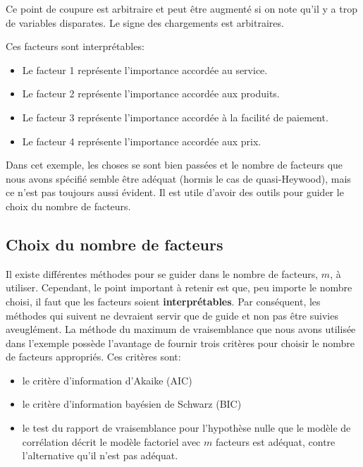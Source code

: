 \documentclass[
  11pt,
  letterpaper,
]{scrbook}
\providecommand{\tightlist}{%
  \setlength{\itemsep}{0pt}\setlength{\parskip}{0pt}}\usepackage{longtable,booktabs,array}
\theoremstyle{definition}
\theoremstyle{remark}
\begin{document}
Ce point de coupure est arbitraire et peut être augmenté si on note
qu'il y a trop de variables disparates. Le signe des chargements est
arbitraires.

Ces facteurs sont interprétables:

\begin{itemize}
\tightlist
\item
  Le facteur 1 représente l'importance accordée au service.
\item
  Le facteur 2 représente l'importance accordée aux produits.
\item
  Le facteur 3 représente l'importance accordée à la facilité de
  paiement.
\item
  Le facteur 4 représente l'importance accordée aux prix.
\end{itemize}

Dans cet exemple, les choses se sont bien passées et le nombre de
facteurs que nous avons spécifié semble être adéquat (hormis le cas de
quasi-Heywood), mais ce n'est pas toujours aussi évident. Il est utile
d'avoir des outils pour guider le choix du nombre de facteurs.

\subsection{Choix du nombre de
facteurs}\label{choix-du-nombre-de-facteurs}

Il existe différentes méthodes pour se guider dans le nombre de
facteurs, \(m\), à utiliser. Cependant, le point important à retenir est
que, peu importe le nombre choisi, il faut que les facteurs soient
\textbf{interprétables}. Par conséquent, les méthodes qui suivent ne
devraient servir que de guide et non pas être suivies aveuglément. La
méthode du maximum de vraisemblance que nous avons utilisée dans
l'exemple possède l'avantage de fournir trois critères pour choisir le
nombre de facteurs appropriés. Ces critères sont:

\begin{itemize}
\tightlist
\item
  le critère d'information d'Akaike (AIC)
\item
  le critère d'information bayésien de Schwarz (BIC)
\item
  le test du rapport de vraisemblance pour l'hypothèse nulle que le
  modèle de corrélation décrit le modèle factoriel avec \(m\) facteurs
  est adéquat, contre l'alternative qu'il n'est pas adéquat.
\end{itemize}
\end{document}
